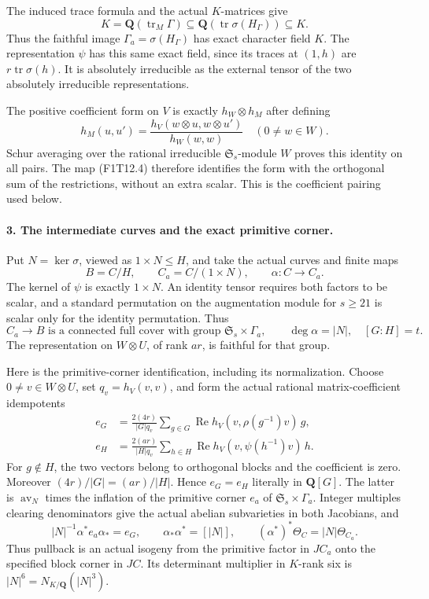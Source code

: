 The induced trace formula and the actual \(K\)-matrices give
\[
 K=\mathbf Q(\operatorname{tr}_M\Gamma)
       \subseteq\mathbf Q(\operatorname{tr}\sigma(H_\Gamma))
       \subseteq K .
 \tag{F1T12.6}
\]
Thus the faithful image \(\Gamma_a=\sigma(H_\Gamma)\)
has exact character field \(K\). The representation \(\psi\)
has this same exact field, since its traces at \((1,h)\)
are \(r\operatorname{tr}\sigma(h)\).
It is absolutely irreducible as the external tensor of
the two absolutely irreducible representations.

The positive coefficient form on \(V\) is exactly
\(h_W\otimes h_M\) after defining
\[
 h_M(u,u')=
 \frac{h_V(w\otimes u,w\otimes u')}{h_W(w,w)}
 \quad(0\ne w\in W).
 \tag{F1T12.7}
\]
Schur averaging over the rational irreducible
\(\mathfrak S_s\)-module \(W\) proves this identity on all
pairs. The map (F1T12.4) therefore identifies the form
with the orthogonal sum of the restrictions, without an
extra scalar. This is the coefficient pairing used below.

\paragraph{3. The intermediate curves and the exact primitive corner.}
Put \(N=\ker\sigma\), viewed as \(1\times N\le H\), and
take the actual curves and finite maps
\[
 B=C/H,\qquad C_a=C/(1\times N),\qquad
 \alpha:C\longrightarrow C_a .
 \tag{F1T12.8}
\]
The kernel of \(\psi\) is exactly \(1\times N\).
An identity tensor requires both factors to be scalar,
and a standard permutation on the augmentation module
for \(s\ge21\) is scalar only for the identity permutation.
Thus
\[
 C_a\longrightarrow B\text{ is a connected full cover
 with group }\mathfrak S_s\times\Gamma_a,
 \qquad \deg\alpha=|N|,\quad [G:H]=t.
 \tag{F1T12.9}
\]
The representation on \(W\otimes U\), of rank \(ar\),
is faithful for that group.

Here is the primitive-corner identification, including its
normalization. Choose \(0\ne v\in W\otimes U\), set
\(q_v=h_V(v,v)\), and form the actual rational
matrix-coefficient idempotents
\[
 \begin{split}
 e_G&=\frac{2(4r)}{|G|q_v}
    \sum_{g\in G}\operatorname{Re}h_V(v,\rho(g^{-1})v)\,g,\\
 e_H&=\frac{2(ar)}{|H|q_v}
    \sum_{h\in H}\operatorname{Re}h_V(v,\psi(h^{-1})v)\,h .
 \end{split}
 \tag{F1T12.10}
\]
For \(g\notin H\), the two vectors belong to orthogonal
blocks and the coefficient is zero. Moreover
\((4r)/|G|=(ar)/|H|\). Hence \(e_G=e_H\) literally in
\(\mathbf Q[G]\). The latter is
\(\operatorname{av}_N\) times the inflation of the
primitive corner \(e_a\) of \(\mathfrak S_s\times\Gamma_a\).
Integer multiples clearing denominators give the actual
abelian subvarieties in both Jacobians, and
\[
 |N|^{-1}\alpha^* e_a\alpha_*=e_G,\qquad
 \alpha_*\alpha^*=[|N|],\qquad
 (\alpha^*)^*\Theta_C=|N|\Theta_{C_a}.
 \tag{F1T12.11}
\]
Thus pullback is an actual isogeny from the primitive
factor in \(JC_a\) onto the specified block corner in \(JC\).
Its determinant multiplier in \(K\)-rank six is
\(|N|^6=N_{K/\mathbf Q}(|N|^3)\).

